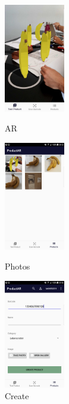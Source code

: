 \documentclass{scrartcl}
\begin{document}
\begin{figure}[h]
   \begin{minipage}[b]{.2\linewidth} %
      \includegraphics[width=100px]{img/screenshots/screenshot_4.png}
      \caption{AR}
   \end{minipage}
   \hspace{.1\linewidth}%
   \begin{minipage}[b]{.2\linewidth} %
      \includegraphics[width=100px]{img/screenshots/screenshot_5.png}
      \caption{Photos}
   \end{minipage}
   \hspace{.1\linewidth}%
   \begin{minipage}[b]{.2\linewidth} %
      \includegraphics[width=100px]{img/screenshots/screenshot_6.png}
      \caption{Create}
   \end{minipage}
\end{figure}

\newpage
\end{document}
